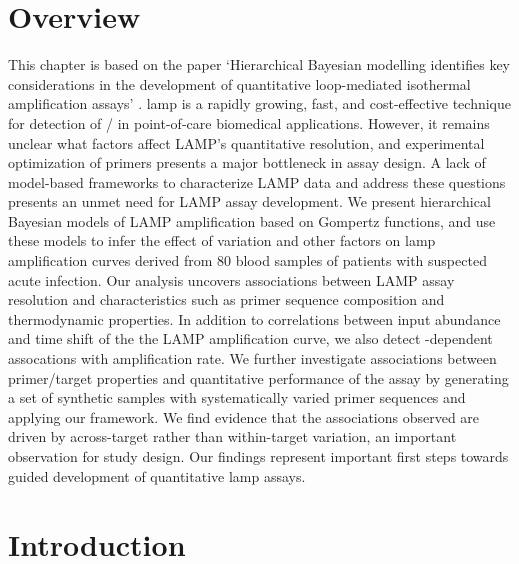 \documentclass[../thesis.tex]{subfiles}
\begin{document}
\section{Overview}
This chapter is based on the paper `Hierarchical Bayesian modelling identifies key considerations in the development of quantitative loop-mediated isothermal amplification assays' \citep{bradley_hierarchical_2023}. \Gls{lamp} is a rapidly growing, fast, and cost-effective technique for detection of / in point-of-care biomedical applications. However, it remains unclear what factors affect LAMP's quantitative resolution, and experimental optimization of primers presents a major bottleneck in assay design. A lack of model-based frameworks to characterize LAMP data and address these questions presents an unmet need for LAMP assay development.
We present hierarchical Bayesian models of LAMP amplification based on Gompertz functions, and use these models to infer the effect of  variation and other factors on \gls{lamp} amplification curves derived from 80 blood samples of patients with suspected acute infection. Our analysis uncovers associations between LAMP assay resolution and characteristics such as primer sequence composition and thermodynamic properties. In addition to correlations between  input abundance and time shift of the the LAMP amplification curve, we also detect -dependent assocations with amplification rate.  We further investigate associations between primer/target properties and quantitative performance of the assay by generating a set of synthetic  samples with systematically varied primer sequences and applying our framework. We find evidence that the associations observed are driven by across-target rather than within-target variation, an important observation for study design. Our findings represent important first steps towards guided development of quantitative \gls{lamp} assays.


\section{Introduction \label{sec:intro}}
\end{document}

